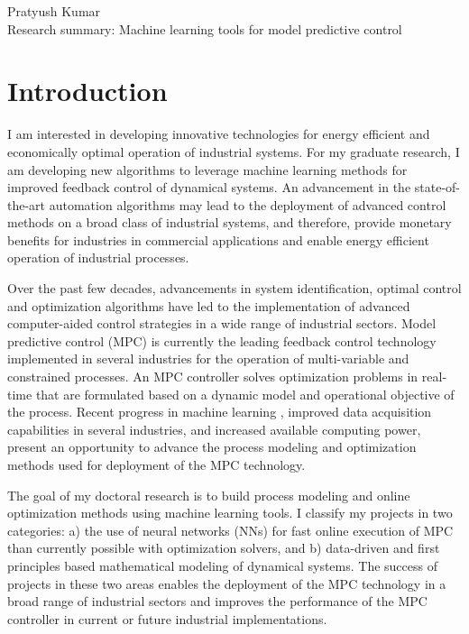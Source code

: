 \documentclass[11pt, a4paper]{article} %
\begin{document}
	
\noindent \large{Pratyush Kumar} \vspace{0.1in} \\
Research summary: Machine learning tools for model predictive control
\normalsize	

\vspace{0.1in}
\section*{Introduction}

I am interested in developing innovative technologies for energy efficient and
economically optimal operation of industrial systems. For my graduate research,
I am developing new algorithms to leverage machine learning methods for improved
feedback control of dynamical systems. An advancement in the state-of-the-art
automation algorithms may lead to the deployment of advanced control methods on
a broad class of industrial systems, and therefore, provide monetary benefits
for industries in commercial applications and enable energy efficient operation
of industrial processes.

Over the past few decades, advancements in system identification, optimal
control and optimization algorithms have led to the implementation of advanced
computer-aided control strategies in a wide range of industrial sectors. Model
predictive control (MPC) is currently the leading feedback control technology
implemented in several industries for the operation of multi-variable and
constrained processes. An MPC controller solves optimization problems in
real-time that are formulated based on a dynamic model and operational objective
of the process. Recent progress in machine learning
\citep{lecun:bengio:hinton:2015}, improved data acquisition capabilities in
several industries, and increased available computing power, present an
opportunity to advance the process modeling and optimization methods used for
deployment of the MPC technology.

The goal of my doctoral research is to build process modeling and online
optimization methods using machine learning tools. I classify my projects in two
categories: a) the use of neural networks (NNs) for fast online execution of MPC
than currently possible with optimization solvers, and b) data-driven and first
principles based mathematical modeling of dynamical systems. The success of
projects in these two areas enables the deployment of the MPC technology in a
broad range of industrial sectors and improves the performance of the MPC
controller in current or future industrial implementations.
\end{document}
